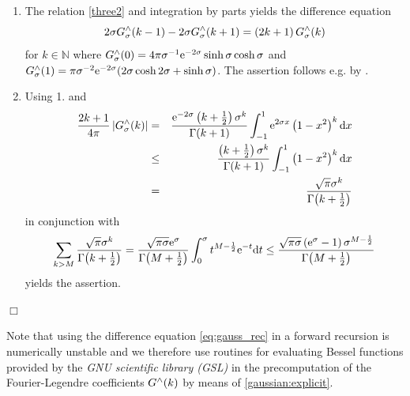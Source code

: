 \documentclass[11pt,a4paper,twoside,bibtotoc]{scrartcl}
\theoremstyle{plain}
\theoremstyle{definition}
\theoremstyle{remark}
\newenvironment{proof}{{\bf Proof.}}{$\Box$}
\newcommand{\N}{\ensuremath{\mathbb{N}}}
\newcommand{\abs}[1]{\ensuremath{\left\vert#1\right\vert}}
\newcommand{\fun}[2]{\ensuremath{#1{\hspace{-0.4ex}}\left(#2\right)}}
\newcommand{\dx}{\text{\rm{d}}}
\newcommand{\e}{\mbox{\rm{e}}}
\numberwithin{equation}{section}
\numberwithin{table}{section}
\numberwithin{figure}{section}
\begin{document}
\begin{proof}
  \begin{enumerate}
  \item The relation \eqref{three2} and integration by parts yields the
    difference equation
    \begin{equation}\label{eq:gauss_rec}
    {2\sigma}\fun{G_{\sigma}^{\wedge}}{k-1} - {2\sigma}\fun{G_{\sigma}^{\wedge}}{k+1} = 
    \left(2k+1\right)\fun{G_{\sigma}^{\wedge}}{k}
    \end{equation}
    for $k\in \N$ where $\fun{G_{\sigma}^{\wedge}}{0} = 4 \pi \sigma^{-1}
    \e^{-2\sigma} \sinh \sigma \cosh \sigma$ and
    $\fun{G_{\sigma}^{\wedge}}{1} = \pi \sigma^{-2} \e^{-2\sigma} (2 \sigma
    \cosh 2 \sigma + \sinh \sigma )$.
    The assertion follows e.g. by \cite{bahu01}.
  \item Using 1. and
  \begin{eqnarray*}
    \frac{2k+1}{4\pi} \abs{\fun{G_{\sigma}^{\wedge}}{k}}
    &=&
    \frac{\e^{-2\sigma}
    \left(k+\frac{1}{2}\right)\sigma^k}{\fun{\Gamma}{k+1}} \int_{-1}^{1}
    \e^{2\sigma x} \left(1-x^2\right)^k \dx x\\
    &\le&
    \frac{\left(k+\frac{1}{2}\right)\sigma^k}{\fun{\Gamma}{k+1}}
    \int_{-1}^{1} \left(1-x^2\right)^k \dx x\\
    &=&
    \frac{\sqrt{\pi}\sigma^k}{\fun{\Gamma}{k+\frac{1}{2}}}
  \end{eqnarray*}
  in conjunction with
  \begin{equation*}
    \sum_{k>M} \frac{\sqrt{\pi}\sigma^k}{\fun{\Gamma}{k+\frac{1}{2}}}\\
    =
    \frac{\sqrt{\pi\sigma}\e^{\sigma}}{\fun{\Gamma}{M+\frac{1}{2}}} 
    \int_{0}^{\sigma} t^{M-\frac{1}{2}} \e^{-t} \dx t\\
    \le
    \frac{\sqrt{\pi\sigma}\left(\e^{\sigma}-1\right)
    \sigma^{M-\frac{1}{2}}}{\fun{\Gamma}{M+\frac{1}{2}}}
  \end{equation*}
  yields the assertion.
\end{enumerate}
  \hfill
\end{proof}

Note that using the difference equation \eqref{eq:gauss_rec} in a forward
recursion is numerically unstable and we therefore use routines for
evaluating Bessel functions provided by
the \emph{GNU scientific library (GSL)} \cite{gsl} in the
precomputation of the Fourier-Legendre coefficients $\fun{G^{\wedge}}{k}$ 
by means of \eqref{gaussian:explicit}.
\end{document}
